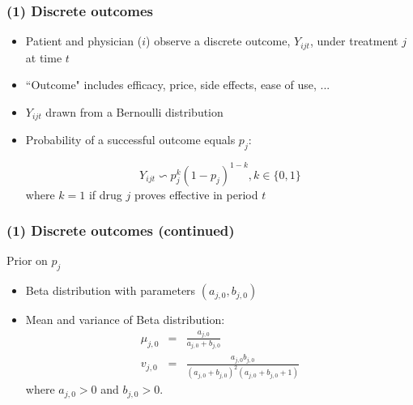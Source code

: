 \documentclass[aspectratio=169,11pt]{beamer}
\begin{document}
\begin{frame}
\frametitle{(1) Discrete outcomes}

\begin{itemize}
\item Patient and physician ($i$) observe a discrete outcome, $Y_{ijt}$,
under treatment $j$ at time $t$

\item ``Outcome" includes efficacy, price, side effects, ease of use, ... 
\pause

\item $Y_{ijt}$ drawn from a Bernoulli distribution

\item Probability of a successful outcome equals $p_{j}$:

\[
Y_{ijt}\backsim p_{j}^{k}(1-p_{j})^{1-k},k\in \{0,1\}
\]
where $k=1$ if drug $j$ proves effective in period $t$
\end{itemize}
\end{frame}


\begin{frame}
\frametitle{(1) Discrete outcomes (continued)}

Prior on $p_{j}$

\begin{itemize}
\item Beta distribution with parameters $(a_{j,0},b_{j,0})$

\item Mean and variance of Beta distribution: 
\begin{eqnarray*}
\mu _{j,0} &=&\frac{a_{j,0}}{a_{j,0}+b_{j,0}}  \label{mean_parm} \\
v_{j,0} &=&\frac{a_{j,0}b_{j,0}}{(a_{j,0}+b_{j,0})^{2}(a_{j,0}+b_{j,0}+1)}
\end{eqnarray*}
where $a_{j,0}>0$ and $b_{j,0}>0$.
\end{itemize}
\end{frame}

\end{document}
